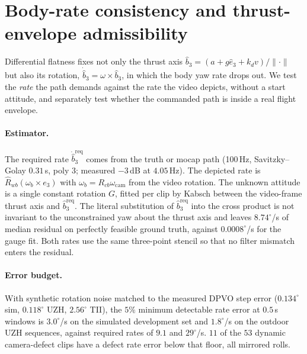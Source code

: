 
\section{Body-rate consistency and thrust-envelope admissibility}
\label{sec:rate-envelope}

Differential flatness fixes not only the thrust axis $\hat b_3 = (a + g\hat e_3 + k_d v)/\|\cdot\|$
but also its rotation, $\dot{\hat b}_3 = \omega \times \hat b_3$, in which the body yaw rate drops
out. We test the \emph{rate} the path demands against the rate the video depicts, without a start
attitude, and separately test whether the commanded path is inside a real flight envelope.

\paragraph{Estimator.} The required rate $\dot{\hat b}_3^{\mathrm{req}}$ comes from the truth or
mocap path (100\,Hz, Savitzky--Golay $0.31$\,s, poly 3; measured $-3$\,dB at $4.05$\,Hz). The
depicted rate is $\hat R_{wb}(\omega_b \times e_3)$ with $\omega_b = R_{cb}\omega_{\mathrm{cam}}$
from the video rotation. The unknown attitude is a single constant rotation $G$, fitted per clip
by Kabsch between the video-frame thrust axis and $\hat b_3^{\mathrm{req}}$. The literal
substitution of $\hat b_3^{\mathrm{req}}$ into the cross product is not invariant to the
unconstrained yaw about the thrust axis and leaves $8.74^\circ$/s of median residual on perfectly
feasible ground truth, against $0.0008^\circ$/s for the gauge fit. Both rates use the same
three-point stencil so that no filter mismatch enters the residual.

\paragraph{Error budget.} With synthetic rotation noise matched to the measured DPVO step error
($0.134^\circ$ sim, $0.118^\circ$ UZH, $2.56^\circ$ TII), the $5\%$ minimum detectable rate error
at $0.5$\,s windows is $3.0^\circ$/s on the simulated development set and $1.8^\circ$/s on the
outdoor UZH sequences, against required rates of $9.1$ and $29^\circ$/s. $11$ of the $53$ dynamic
camera-defect clips have a defect rate error below that floor, all mirrored rolls.

